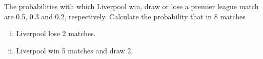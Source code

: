 	\item	The probabilities with which Liverpool win, draw or lose a premier league match are 0.5, 0.3 and 0.2, respectively. Calculate the probability that in 8 matches
	\begin{enumerate}[(i)]
		\item 	Liverpool lose 2 matches.
		\item	Liverpool win 5 matches and draw 2.
	\end{enumerate}